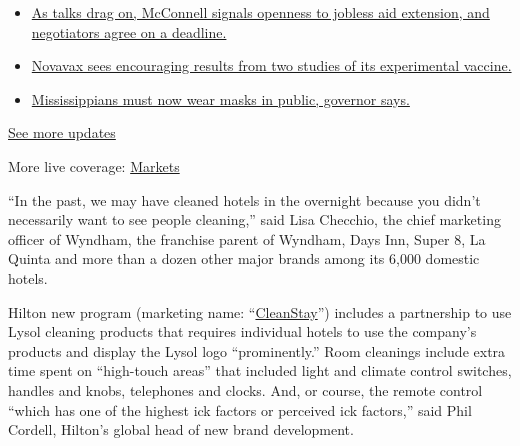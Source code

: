 \begin{itemize}
\tightlist
\item
  \href{https://www.nytimes.com/2020/08/04/world/coronavirus-cases.html?action=click\&pgtype=Article\&state=default\&region=MAIN_CONTENT_1\&context=storylines_live_updates\#link-762df92}{As
  talks drag on, McConnell signals openness to jobless aid extension,
  and negotiators agree on a deadline.}
\item
  \href{https://www.nytimes.com/2020/08/04/world/coronavirus-cases.html?action=click\&pgtype=Article\&state=default\&region=MAIN_CONTENT_1\&context=storylines_live_updates\#link-1228a480}{Novavax
  sees encouraging results from two studies of its experimental
  vaccine.}
\item
  \href{https://www.nytimes.com/2020/08/04/world/coronavirus-cases.html?action=click\&pgtype=Article\&state=default\&region=MAIN_CONTENT_1\&context=storylines_live_updates\#link-794484ed}{Mississippians
  must now wear masks in public, governor says.}
\end{itemize}

\href{https://www.nytimes.com/2020/08/04/world/coronavirus-cases.html?action=click\&pgtype=Article\&state=default\&region=MAIN_CONTENT_1\&context=storylines_live_updates}{See
more updates}

More live coverage:
\href{https://www.nytimes.com/live/2020/08/04/business/stock-market-today-coronavirus?action=click\&pgtype=Article\&state=default\&region=MAIN_CONTENT_1\&context=storylines_live_updates}{Markets}

``In the past, we may have cleaned hotels in the overnight because you
didn't necessarily want to see people cleaning,'' said Lisa Checchio,
the chief marketing officer of Wyndham, the franchise parent of Wyndham,
Days Inn, Super 8, La Quinta and more than a dozen other major brands
among its 6,000 domestic hotels.

Hilton new program (marketing name:
``\href{https://www.hilton.com/en/corporate/cleanstay/}{CleanStay}'')
includes a partnership to use Lysol cleaning products that requires
individual hotels to use the company's products and display the Lysol
logo ``prominently.'' Room cleanings include extra time spent on
``high-touch areas'' that included light and climate control switches,
handles and knobs, telephones and clocks. And, or course, the remote
control ``which has one of the highest ick factors or perceived ick
factors,'' said Phil Cordell, Hilton's global head of new brand
development.

